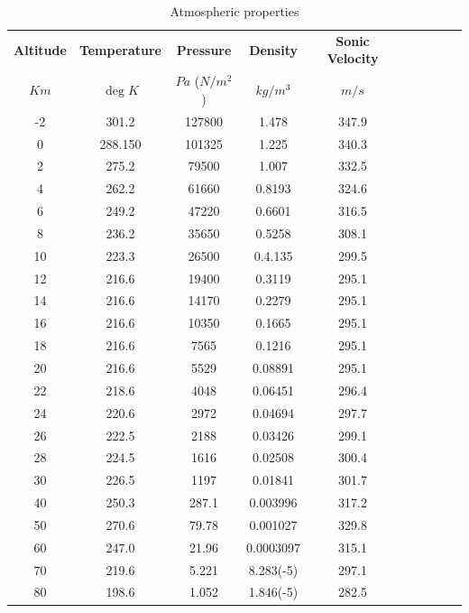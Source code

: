 \documentclass[10pt,openany,twoside]{book}
\numberwithin{equation}{section}   %
\begin{document}
\begin{table}[h]  %
\begin{tabular}{|c|c|c|c|c|c|c|c|c|c|} \hline
{\bf Altitude } & {\bf Temperature}  & {\bf Pressure} & {\bf Density} & {\bf Sonic Velocity} \\
$Km$            & $\deg K$           & $Pa$ ($N/m^2$)        & $kg/m^3$      & $m/s$ \\ \hline
  -2 & 301.2 & 127800 & 1.478 & 347.9 \\ \hline
   0 & 288.150 & 101325 & 1.225 & 340.3 \\ \hline
   2 & 275.2 & 79500 & 1.007 & 332.5 \\ \hline
   4 & 262.2 & 61660 & 0.8193 & 324.6 \\ \hline
   6 & 249.2 & 47220 & 0.6601 & 316.5 \\ \hline
   8 & 236.2 & 35650 & 0.5258 & 308.1 \\ \hline
  10 & 223.3 & 26500 & 0.4.135 & 299.5 \\ \hline
  12 & 216.6 & 19400 & 0.3119 & 295.1 \\ \hline
  14 & 216.6 & 14170 & 0.2279 & 295.1 \\ \hline
  16 & 216.6 & 10350 & 0.1665 & 295.1 \\ \hline
  18 & 216.6 & 7565 & 0.1216 & 295.1 \\ \hline
  20 & 216.6 & 5529 & 0.08891 & 295.1 \\ \hline
  22 & 218.6 & 4048 & 0.06451 & 296.4 \\ \hline
  24 & 220.6 & 2972 & 0.04694 & 297.7 \\ \hline
  26 & 222.5 & 2188 & 0.03426 & 299.1 \\ \hline
  28 & 224.5 & 1616 & 0.02508 & 300.4 \\ \hline
  30 & 226.5 & 1197 & 0.01841 & 301.7 \\ \hline
  40 & 250.3 & 287.1 & 0.003996 & 317.2 \\ \hline
  50 & 270.6 & 79.78 & 0.001027 & 329.8 \\ \hline
  60 & 247.0 & 21.96 & 0.0003097 & 315.1 \\ \hline
  70 & 219.6 & 5.221 & 8.283(-5) & 297.1 \\ \hline
  80 & 198.6 & 1.052 & 1.846(-5) & 282.5 \\ \hline
\end{tabular}
\caption{Atmospheric properties} \label{table:atmos}
\end{table}
\end{document}
